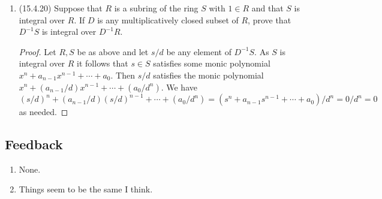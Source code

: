 \documentclass[11pt]{article}
\DeclareMathOperator{\im}{im}
\begin{document}
\begin{enumerate}
\begin{proof}
        Suppose the induced maps are surjective for every maximal ideal and suppose by way of contradiction that $\im \varphi\colon M\to N$ is a proper submodule of $N$. Then in the $R$-module $N/\im \varphi$ let $[n]$ be a nonzero element and consider the annihilator $I$ of $[n]$, which is proper since $[n]$ is nonzero. The ideal $I$ is contained in some maximal ideal $\mathfrak{m}$, and we consider the element $n/1\in N_{\mathfrak{m}}$. By the surjectivity of the induced map $\varphi$ there exists $m/d\in M_{\mathfrak{m}}$ such that $\varphi(m/d) = \varphi(m)/d = n/1$, which implies that there is $x\in R\setminus\mathfrak{m}$ such that $\varphi(xm) = xdn$. It follows that $xd\in I\subseteq \mathfrak{m}$, a contradiction. Hence $\varphi\colon M\to N$ is surjective as needed.
    \end{proof}
    \item (15.4.20) Suppose that $R$ is a subring of the ring $S$ with $1\in R$ and that $S$ is integral over $R$. If $D$ is any multiplicatively closed subset of $R$, prove that $D^{-1}S$ is integral over $D^{-1}R$. \begin{proof}
        Let $R, S$ be as above and let $s/d$ be any element of $D^{-1}S$. As $S$ is integral over $R$ it follows that $s\in S$ satisfies some monic polynomial $x^n+a_{n-1}x^{n-1}+\cdots+a_0$. Then $s/d$ satisfies the monic polynomial $x^n+(a_{n-1}/d)x^{n-1}+\cdots+(a_0/d^n)$. We have $(s/d)^n + (a_{n-1}/d)(s/d)^{n-1}+\cdots+(a_0/d^n) = (s^n+a_{n-1}s^{n-1}+\cdots+a_0)/d^n = 0/d^n = 0$ as needed.
    \end{proof}
\end{enumerate}
\subsection*{Feedback}
\begin{enumerate}
    \item None.
    \item Things seem to be the same I think.
\end{enumerate}
\end{document}
